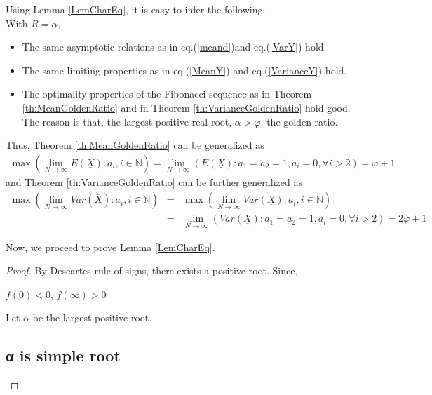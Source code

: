 \begin{multicols}{2}
Using Lemma \ref{LemCharEq}, it is easy to infer the following:\\
With $R = \alpha$,
\begin{itemize}
\item The same asymptotic relations as in eq.(\ref{meand})and eq.(\ref{VarY}) hold. 
\item The same limiting properties as in eq.(\ref{MeanY}) and eq.(\ref{VarianceY}) hold.
\item The optimality properties of the Fibonacci sequence as in Theorem \ref{th:MeanGoldenRatio} and in Theorem \ref{th:VarianceGoldenRatio} hold good. The reason is that, the largest positive real root, $\alpha > \varphi$, the golden ratio.
\end{itemize}
Thus, Theorem \ref{th:MeanGoldenRatio} can be generalized as 
\begin{eqnarray*}
\max{\left(\lim_{N\rightarrow \infty} E(\underline{X}): a_i, i \in \mathbb N \right)} = \lim_{N \rightarrow \infty}\left(E(\underline{X}):a_1 = a_2 = 1, a_{i}=0, \forall i> 2\right) = \varphi + 1
\end{eqnarray*}
and Theorem \ref{th:VarianceGoldenRatio} can be further generalized as 
\begin{eqnarray*}
\max{\left(\lim_{N\rightarrow \infty}Var(\bar{X}): a_i, i \in \mathbb N\right)}&=& \max{\left(\lim_{N\rightarrow \infty}Var(\underline{X}): a_i, i \in \mathbb N\right)}\\
\nonumber &=& \lim_{N \rightarrow \infty}\left(Var(\underline{X}):a_1=a_2=1, a_{i}=0,\forall i > 2\right) = 2\varphi + 1
\end{eqnarray*}

Now, we proceed to prove Lemma \ref{LemCharEq}.
\begin{proof}\renewcommand{\qedsymbol}{} 
By Descartes rule of signs, there exists a positive root. Since, \\ 
 \begin{center}
 $ f(0) < 0$, $f(\infty) > 0$ \\
 \end{center}
Let $\alpha$ be the largest positive root. \\

\subsection{{\greekfont α} is simple root}\label{subsection-11.1}


\end{proof}
\end{multicols}
